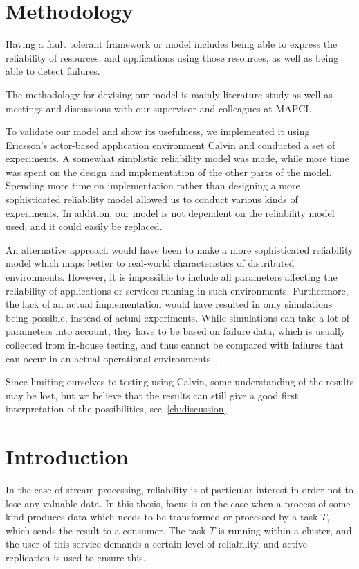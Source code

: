 \documentclass{cslthse-msc}
\begin{document}
\section{Methodology} \label{sec:design_methodology}
Having a fault tolerant framework or model includes being able to express the reliability of resources, and applications using those resources, as well as being able to detect failures. 

The methodology for devising our model is mainly literature study as well as meetings and discussions with our supervisor and colleagues at MAPCI.

To validate our model and show its usefulness, we implemented it using Ericsson's actor-based application environment Calvin \cite{calvin} and conducted a set of experiments. A somewhat simplistic reliability model was made, while more time was spent on the design and implementation of the other parts of the model. Spending more time on implementation rather than designing a more sophisticated reliability model allowed us to conduct various kinds of experiments. In addition, our model is not dependent on the reliability model used, and it could easily be replaced.

An alternative approach would have been to make a more sophisticated reliability model which maps better to real-world characteristics of distributed environments. However, it is impossible to include all parameters affecting the reliability of applications or services running in such environments. Furthermore, the lack of an actual implementation would have resulted in only simulations being possible, instead of actual experiments. While simulations can take a lot of parameters into account, they have to be based on failure data, which is usually collected from in-house testing, and thus cannot be compared with failures that can occur in an actual operational environments~\cite{surveyReliabilityDistr}. %

Since limiting ourselves to testing using Calvin, some understanding of the results may be lost, but we believe that the results can still give a good first interpretation of the possibilities, see~\cref{ch:discussion}. 

\section{Introduction} \label{sec:design_intro}
In the case of stream processing, reliability is of particular interest in order not to lose any valuable data. In this thesis, focus is on the case when a process of some kind produces data which needs to be transformed or processed by a task $T$, which sends the result to a consumer. The task $T$ is running within a cluster, and the user of this service demands a certain level of reliability, and active replication is used to ensure this.	
\end{document}

